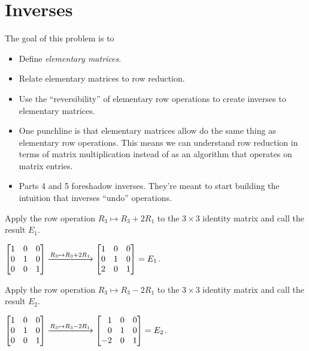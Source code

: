 \documentclass{problemset}
\newcommand{\bookonlynewpage}{\begin{bookonly}\newpage\end{bookonly}}
\begin{document}
	\bookonlynewpage
\section*{Inverses}

	\question
	\begin{annotation}
		\begin{goals}

			The goal of this problem is to
			\begin{itemize}
				\item Define \emph{elementary matrices}.
				\item Relate elementary matrices to row reduction.
				\item Use the ``reversibility'' of elementary row
					operations to create inverses to elementary matrices.
			\end{itemize}
		\end{goals}

		\begin{notes}
			\begin{itemize}
				\item One punchline is that elementary matrices
					allow do the same thing as elementary row
					operations. This means we can understand row
					reduction in terms of matrix multiplication instead
					of as an algorithm that operates on matrix entries.
				\item Parts 4 and 5 foreshadow inverses. They're meant to start
					building the intuition that inverses ``undo'' operations.
			\end{itemize}
		\end{notes}
	\end{annotation}
	\begin{parts}
		\item Apply the row operation $R_3\mapsto R_3+2R_1$ to the $3\times 3$ identity
		matrix and call the result $E_1$.
			\begin{solution}
				$\mat{1&0&0\\0&1&0\\0&0&1} \xrightarrow{R_3\mapsto R_3+2R_1} \mat{1&0&0\\0&1&0\\2&0&1}=E_1$.
			\end{solution}
		\item Apply the row operation $R_3\mapsto R_3-2R_1$ to the $3\times 3$ identity
		matrix and call the result $E_2$.
			\begin{solution}
				$\mat{1&0&0\\0&1&0\\0&0&1} \xrightarrow{R_3\mapsto R_3-2R_1} \mat{1&0&0\\0&1&0\\-2&0&1}=E_2$.
			\end{solution}
	\end{parts}
\end{document}

